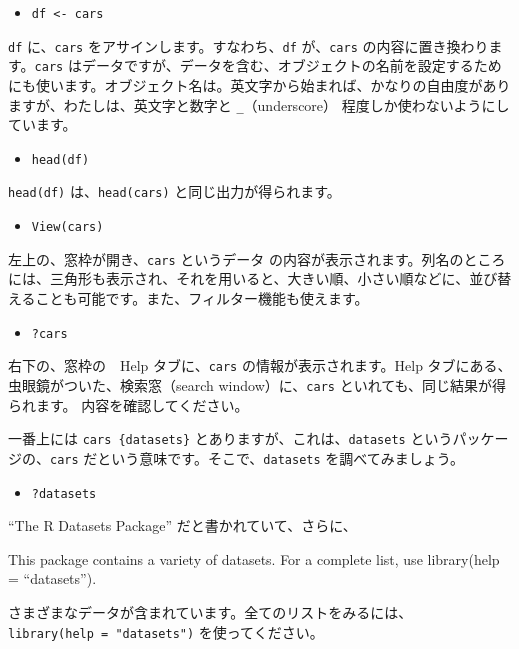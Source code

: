 \documentclass[
  xelatex, ja=standard]{bxjsbook}
\providecommand{\tightlist}{%
  \setlength{\itemsep}{0pt}\setlength{\parskip}{0pt}}
\theoremstyle{definition}
\theoremstyle{definition}
\theoremstyle{definition}
\theoremstyle{definition}
\theoremstyle{remark}
\begin{document}
\begin{itemize}
\tightlist
\item
  \texttt{df\ \textless{}-\ cars}
\end{itemize}

\texttt{df} に、\texttt{cars} をアサインします。すなわち、\texttt{df} が、\texttt{cars} の内容に置き換わります。\texttt{cars} はデータですが、データを含む、オブジェクトの名前を設定するためにも使います。オブジェクト名は。英文字から始まれば、かなりの自由度がありますが、わたしは、英文字と数字と \texttt{\_}（underscore） 程度しか使わないようにしています。

\begin{itemize}
\tightlist
\item
  \texttt{head(df)}
\end{itemize}

\texttt{head(df)} は、\texttt{head(cars)} と同じ出力が得られます。

\begin{itemize}
\tightlist
\item
  \texttt{View(cars)}
\end{itemize}

左上の、窓枠が開き、\texttt{cars} というデータ の内容が表示されます。列名のところには、三角形も表示され、それを用いると、大きい順、小さい順などに、並び替えることも可能です。また、フィルター機能も使えます。

\begin{itemize}
\tightlist
\item
  \texttt{?cars}
\end{itemize}

右下の、窓枠の　Help タブに、\texttt{cars} の情報が表示されます。Help タブにある、虫眼鏡がついた、検索窓（search window）に、\texttt{cars} といれても、同じ結果が得られます。 内容を確認してください。

一番上には \texttt{cars\ \{datasets\}} とありますが、これは、\texttt{datasets} というパッケージの、\texttt{cars} だという意味です。そこで、\texttt{datasets} を調べてみましょう。

\begin{itemize}
\tightlist
\item
  \texttt{?datasets}
\end{itemize}

``The R Datasets Package'' だと書かれていて、さらに、

This package contains a variety of datasets. For a complete list, use library(help = ``datasets'').

さまざまなデータが含まれています。全てのリストをみるには、\texttt{library(help\ =\ "datasets")} を使ってください。
\end{document}
